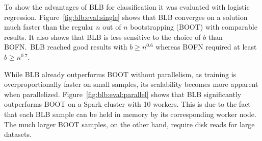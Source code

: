 To show the advantages of BLB for classification it was evaluated with logistic regression.
Figure~\ref{fig:blb:eval:single} shows that BLB converges on a solution much faster than the regular \(n\) out of \(n\) bootstrapping (BOOT) with comparable results.
It also shows that BLB is less sensitive to the choice of \(b\) than BOFN.\
BLB reached good results with \(b \geq n^{0.6}\) whereas BOFN required at least \(b \geq n^{0.7}\).

While BLB already outperforms BOOT without parallelism, as training is overproportionally faster on small samples, its scalability becomes more apparent when parallelized.
Figure~\ref{fig:blb:eval:parallel} shows that BLB significantly outperforms BOOT on a Spark cluster with 10 workers.
This is due to the fact that each BLB sample can be held in memory by its corresponding worker node.
The much larger BOOT samples, on the other hand, require disk reads for large datasets.
